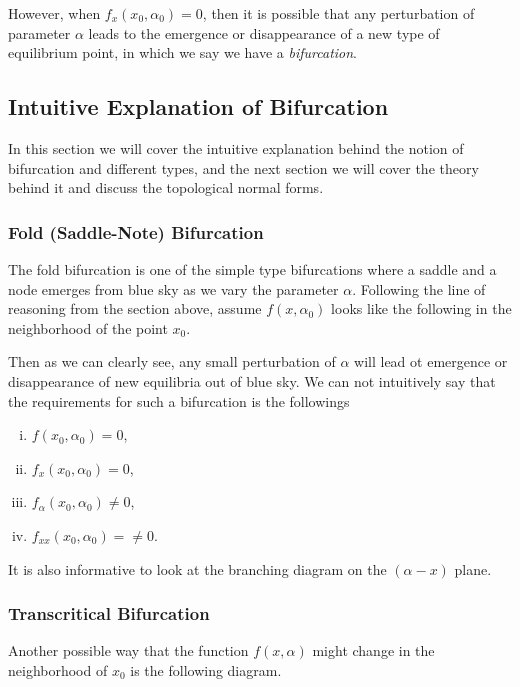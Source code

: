 

However, when $f_x(x_0,\alpha_0) = 0$, then it is possible that any perturbation of parameter $\alpha$ leads to the emergence or disappearance of a new type of equilibrium point, in which we say we have a \emph{bifurcation}. 


\subsection{Intuitive Explanation of Bifurcation}
In this section we will cover the intuitive explanation behind the notion of bifurcation and different types, and the next section we will cover the theory behind it and discuss the topological normal forms.
\subsubsection{Fold (Saddle-Note) Bifurcation}
The fold bifurcation is one of the simple type bifurcations where a saddle and a node emerges from blue sky as we vary the parameter $\alpha$. Following the line of reasoning from the section above, assume $f(x,\alpha_0)$ looks like the following in the neighborhood of the point $x_0$.



Then as we can clearly see, any small perturbation of $\alpha$ will lead ot emergence or disappearance of new equilibria out of blue sky. We can not intuitively say that the requirements for such a bifurcation is the followings
\begin{enumerate}[(i)]
	\item $f(x_0,\alpha_0) = 0$,
	\item $f_x(x_0,\alpha_0) = 0$,
	\item $f_\alpha(x_0, \alpha_0) \neq 0$,
	\item $f_{xx}(x_0,\alpha_0) = \neq 0$.
\end{enumerate}

It is also informative to look at the branching diagram on the $(\alpha-x)$ plane.




\subsubsection{Transcritical Bifurcation}
Another possible way that the function $f(x,\alpha)$ might change in the neighborhood of $x_0$ is the following diagram.

